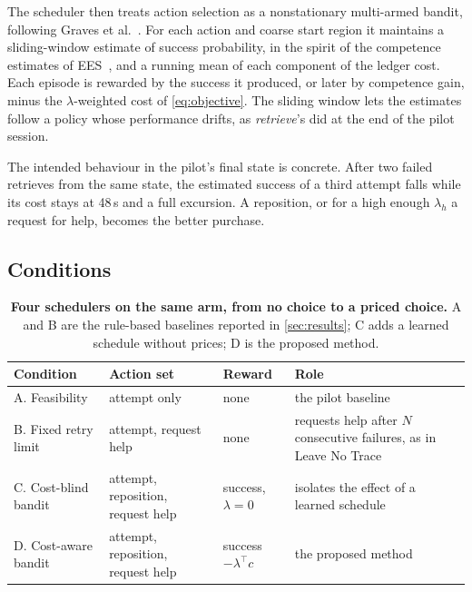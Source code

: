 \documentclass[runningheads]{llncs}
\newcommand{\task}[1]{\textit{#1}}
\begin{document}
The scheduler then treats action selection as a nonstationary multi-armed bandit, following Graves et al.~\cite{graves2017}. For each action and coarse start region it maintains a sliding-window estimate of success probability, in the spirit of the competence estimates of EES~\cite{kumar2024}, and a running mean of each component of the ledger cost. Each episode is rewarded by the success it produced, or later by competence gain, minus the $\lambda$-weighted cost of \cref{eq:objective}. The sliding window lets the estimates follow a policy whose performance drifts, as \task{retrieve}'s did at the end of the pilot session.

The intended behaviour in the pilot's final state is concrete. After two failed retrieves from the same state, the estimated success of a third attempt falls while its cost stays at 48\,s and a full excursion. A reposition, or for a high enough $\lambda_h$ a request for help, becomes the better purchase.

\subsection{Conditions}
\label{sec:conditions}

\begin{table}[t]
\centering
\small
\setlength{\tabcolsep}{4pt}
\caption{\textbf{Four schedulers on the same arm, from no choice to a priced choice.} A and B are the rule-based baselines reported in \cref{sec:results}; C adds a learned schedule without prices; D is the proposed method.}
\label{tab:conditions}
\begin{tabular}{l>{\raggedright}p{2.6cm}l>{\raggedright\arraybackslash}p{3.8cm}}
\toprule
\textbf{Condition} & \textbf{Action set} & \textbf{Reward} & \textbf{Role} \\
\midrule
A. Feasibility        & attempt only                      & none                     & the pilot baseline \\
B. Fixed retry limit  & attempt, request help             & none                     & requests help after $N$ consecutive failures, as in Leave No Trace \\
C. Cost-blind bandit  & attempt, reposition, request help & success, $\lambda = 0$   & isolates the effect of a learned schedule \\
D. Cost-aware bandit  & attempt, reposition, request help & success $-\lambda^{\top}c$ & the proposed method \\
\bottomrule
\end{tabular}
\end{table}
\end{document}

